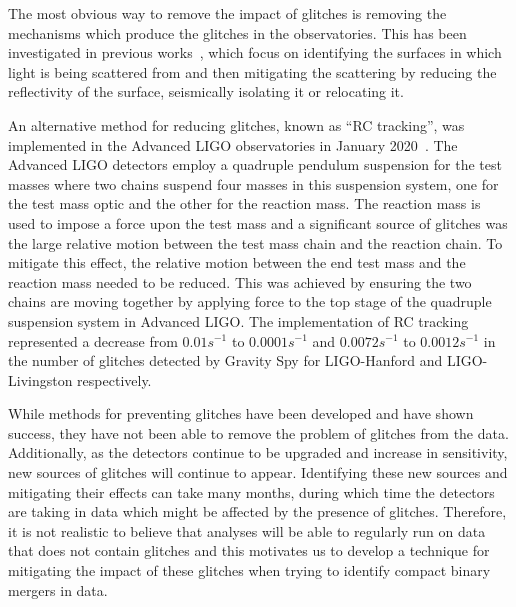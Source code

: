 The most obvious way to remove the impact of glitches is removing the mechanisms which produce the glitches in the observatories. This has been investigated in previous works~\cite{reducing_scattering_o3, TAccadia, Laura_Noise, gwadaptive, HilbertHuang, tvf-EMD, Longo_daily, MichalSub}, which focus on identifying the surfaces in which light is being scattered from and then mitigating the scattering by reducing the reflectivity of the surface, seismically isolating it or relocating it. 

An alternative method for reducing \scl{} glitches, known as ``RC tracking'', was implemented in the Advanced LIGO observatories in January 2020~\cite{reducing_scattering_o3}. The Advanced LIGO detectors employ a quadruple pendulum suspension for the test masses where two chains suspend four masses in this suspension system, one for the test mass optic and the other for the reaction mass. The reaction mass is used to impose a force upon the test mass and a significant source of \scl{} glitches was the large relative motion between the test mass chain and the reaction chain. To mitigate this effect, the relative motion between the end test mass and the reaction mass needed to be reduced. This was achieved by ensuring the two chains are moving together by applying force to the top stage of the quadruple suspension system in Advanced LIGO. The implementation of RC tracking represented a decrease from $0.01 s^{-1}$ to $0.0001 s^{-1}$ and $0.0072 s^{-1}$ to $0.0012 s^{-1}$ in the number of \scl{} glitches detected by Gravity Spy for LIGO-Hanford and LIGO-Livingston respectively.

While methods for preventing \scl{} glitches have been developed and have shown success, they have not been able to remove the problem of \scl{} glitches from the data. Additionally, as the detectors continue to be upgraded and increase in sensitivity, new sources of \scl{} glitches will continue to appear. Identifying these new sources and mitigating their effects can take many months, during which time the detectors are taking in data which might be affected by the presence of \scl{} glitches. Therefore, it is not realistic to believe that analyses will be able to regularly run on data that does not contain \scl{} glitches and this motivates us to develop a technique for mitigating the impact of these glitches when trying to identify compact binary mergers in \gw{} data.

